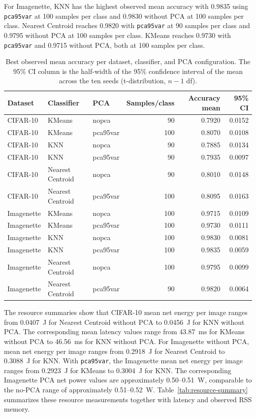\documentclass[sigconf,review,nonacm]{acmart}
\begin{document}
For Imagenette, KNN has the highest observed mean accuracy with 0.9835 using \texttt{pca95var} at 100 samples per class and 0.9830 without PCA at 100 samples per class.
Nearest Centroid reaches 0.9820 with \texttt{pca95var} at 90 samples per class and 0.9795 without PCA at 100 samples per class.
KMeans reaches 0.9730 with \texttt{pca95var} and 0.9715 without PCA, both at 100 samples per class.

\begin{table}[t]
  \caption{Best observed mean accuracy per dataset, classifier, and PCA configuration. The 95\% CI column is the half-width of the 95\% confidence interval of the mean across the ten seeds (t-distribution, $n-1$ df).}
  \label{tab:best-accuracy}
  \centering
  \footnotesize
  \begin{tabular}{@{}lllrrr@{}}
    \toprule
    Dataset & Classifier & PCA & Samples/class & Accuracy mean & 95\% CI \\
    \midrule
    CIFAR-10 & KMeans & nopca & 90 & 0.7920 & 0.0152 \\
    CIFAR-10 & KMeans & pca95var & 100 & 0.8070 & 0.0108 \\
    CIFAR-10 & KNN & nopca & 90 & 0.7885 & 0.0134 \\
    CIFAR-10 & KNN & pca95var & 90 & 0.7935 & 0.0097 \\
    CIFAR-10 & Nearest Centroid & nopca & 90 & 0.8010 & 0.0148 \\
    CIFAR-10 & Nearest Centroid & pca95var & 100 & 0.8095 & 0.0163 \\
    Imagenette & KMeans & nopca & 100 & 0.9715 & 0.0109 \\
    Imagenette & KMeans & pca95var & 100 & 0.9730 & 0.0111 \\
    Imagenette & KNN & nopca & 100 & 0.9830 & 0.0081 \\
    Imagenette & KNN & pca95var & 100 & 0.9835 & 0.0059 \\
    Imagenette & Nearest Centroid & nopca & 100 & 0.9795 & 0.0099 \\
    Imagenette & Nearest Centroid & pca95var & 90 & 0.9820 & 0.0064 \\
    \bottomrule
  \end{tabular}
\end{table}

The resource summaries show that CIFAR-10 mean net energy per image ranges from 0.0407~J for Nearest Centroid without PCA to 0.0456~J for KNN without PCA.
The corresponding mean latency values range from 43.87~ms for KMeans without PCA to 46.56~ms for KNN without PCA.
For Imagenette without PCA, mean net energy per image ranges from 0.2918~J for Nearest Centroid to 0.3088~J for KNN.
With \texttt{pca95var}, the Imagenette mean net energy per image ranges from 0.2923~J for KMeans to 0.3004~J for KNN.
The corresponding Imagenette PCA net power values are approximately 0.50--0.51~W, comparable to the no-PCA range of approximately 0.51--0.52~W.
Table~\ref{tab:resource-summary} summarizes these resource measurements together with latency and observed RSS memory.
\end{document}
